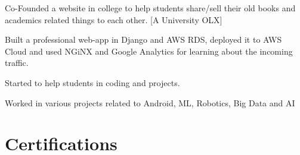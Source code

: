 \documentclass[]{deedy-resume-openfont}
\begin{document}
\begin{minipage}[t]{0.66\textwidth}
\begin{tightemize}
\item Co-Founded a website  in college to help students share/sell their old books and academics related things to each other. [A University OLX]
\item Built a professional web-app in Django and AWS RDS, deployed it to AWS Cloud and used NGiNX and Google Analytics for learning about the incoming traffic.
\end{tightemize}
\sectionsep

\begin{tightemize}
\item Started  to help  students in coding and projects. 
\item Worked in various projects related to Android, ML, Robotics, Big Data and AI
\end{tightemize}




\section{Certifications}
\hspace{9pt}


\end{minipage}
\end{document}
